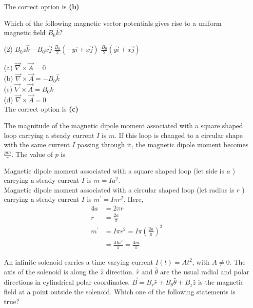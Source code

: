 \begin{enumerate}
\begin{answer}
		The correct option is \textbf{(b)}	
	\end{answer}
	\begin{minipage}{\textwidth}
		\item Which of the following magnetic vector potentials gives rise to a uniform magnetic field $B_{0} \hat{k} ?$
	\end{minipage}
	\begin{tasks}(2)
		\task[\textbf{A.}] $B_{0} z \hat{k}$
		\task[\textbf{B.}]$-B_{0} x \hat{j}$
		\task[\textbf{C.}]$\frac{B_{0}}{2}(-y \hat{i}+x \hat{j})$
		\task[\textbf{D.}]$\frac{B_{0}}{2}(y \hat{i}+x \hat{j})$
	\end{tasks}
	\begin{answer}
		(a) $\vec{\nabla} \times \vec{A}=0$\\
		(b) $\vec{\nabla} \times \vec{A}=-B_{0} \hat{k}$\\
		(c) $\vec{\nabla} \times \vec{A}=B_{0} \hat{k}$\\
		(d) $\vec{\nabla} \times \vec{A}=0$\\
		The correct option is \textbf{(c)}
	\end{answer}
	\begin{minipage}{\textwidth}
		\item The magnitude of the magnetic dipole moment associated with a square shaped loop carrying a steady current $I$ is $m$. If this loop is changed to a circular shape with the same current $I$ passing through it, the magnetic dipole moment becomes $\frac{p m}{\pi} .$ The value of $p$ is
	\end{minipage}
	\begin{answer}
		Magnetic dipole moment associated with a square shaped loop (let side is $a$ ) carrying a steady current $I$ is $m=I a^{2}$.\\
		Magnetic dipole moment associated with a circular shaped loop (let radius is $r$ ) carrying a steady current $I$ is $m^{\prime}=I \pi r^{2}$.
		Here,
		\begin{align*}
		4 a&=2 \pi r \\ r&=\frac{2 a}{\pi} \\ m^{\prime}&=I \pi r^{2}=I \pi\left(\frac{2 a}{\pi}\right)^{2}\\&=\frac{4 I a^{2}}{\pi}=\frac{4 m}{\pi}
		\end{align*} 
	\end{answer}
	\begin{minipage}{\textwidth}
		\item An infinite solenoid carries a time varying current $I(t)=A t^{2}$, with $A \neq 0 .$ The axis of the solenoid is along the $\hat{z}$ direction. $\hat{r}$ and $\hat{\theta}$ are the usual radial and polar directions in cylindrical polar coordinates. $\vec{B}=B_{r} \hat{r}+B_{\theta} \hat{\theta}+B_{z} \hat{z}$ is the magnetic field at a point outside the solenoid. Which one of the following statements is true?

\end{minipage}
\end{enumerate}
